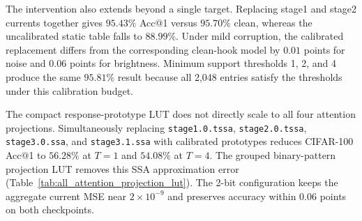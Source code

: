 The intervention also extends beyond a single target. Replacing stage1 and
stage2 currents together gives $95.43\%$ Acc@1 versus $95.70\%$ clean, whereas
the uncalibrated static table falls to $88.99\%$. Under mild corruption, the
calibrated replacement differs from the corresponding clean-hook model by
$0.01$ points for noise and $0.06$ points for brightness.
Minimum support thresholds 1, 2, and 4 produce the same $95.81\%$ result because
all 2,048 entries satisfy the thresholds under this calibration budget.

The compact response-prototype LUT does not directly scale to all four
attention projections. Simultaneously replacing
\texttt{stage1.0.tssa}, \texttt{stage2.0.tssa},
\texttt{stage3.0.ssa}, and \texttt{stage3.1.ssa} with calibrated prototypes
reduces CIFAR-100 Acc@1 to $56.28\%$ at $T=1$ and $54.08\%$ at $T=4$.
The grouped binary-pattern projection LUT removes this SSA approximation error
(Table~\ref{tab:all_attention_projection_lut}). The 2-bit configuration keeps
the aggregate current MSE near $2\times10^{-9}$ and preserves accuracy within
$0.06$ points on both checkpoints.

\begin{table}[H]
\centering
\footnotesize
{}
\caption{All-attention projection-current replacement on QKFormer CIFAR-100.
Both checkpoints use seed 42 and full validation. Deltas are LUT minus clean
in percentage points; small positive values are no-loss fluctuations. FP32
KiB counts table values only. The grouped LUT replaces every attention
\texttt{proj\_conv} current, not Q/K/V projections, MLPs, BN/LIF, or the
complete network.}
\label{tab:all_attention_projection_lut}
\end{table}

